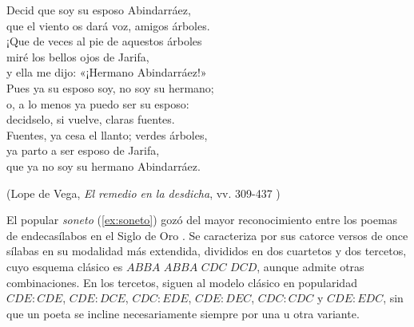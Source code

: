 \begin{exe}
		Decid que soy su esposo Abindarráez,\\
		que el viento os dará voz, amigos árboles.\vspace{.333\baselineskip}\\
		¡Que de veces al pie de aquestos árboles\\
		miré los bellos ojos de Jarifa,\\
		y ella me dijo: «¡Hermano Abindarráez!»\\
		Pues ya su esposo soy, no soy su hermano;\\
		o, a lo menos ya puedo ser su esposo:\\
		decidselo, si vuelve, claras fuentes.\vspace{.333\baselineskip}\\
		Fuentes, ya cesa el llanto; verdes árboles,\\
		ya parto a ser esposo de Jarifa,\\
		que ya no soy su hermano Abindarráez.\\
	\strut\hfill(Lope de Vega, \textit{El remedio en la desdicha}, vv. 309-437 \nocite{vega_remediodesdicha})
\end{exe}

El popular \textit{soneto} (\ref{ex:soneto}) gozó del mayor reconocimiento entre los poemas de endecasílabos en el Siglo de Oro \parencite[252]{navarrotomas1991}. Se caracteriza por sus catorce versos de once sílabas en su modalidad más extendida, divididos en dos cuartetos y dos tercetos, cuyo esquema clásico es $ABBA$ $ABBA$ $CDC$ $DCD$, aunque admite otras combinaciones. En los tercetos, siguen al modelo clásico en popularidad $CDE:CDE$, $CDE:DCE$, $CDC:EDE$, $CDE:DEC$, $CDC:CDC$ y $CDE:EDC$, sin que un poeta se incline necesariamente siempre por una u otra variante.

